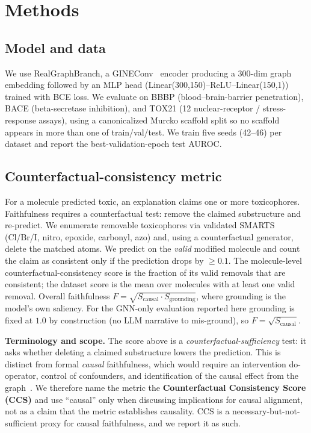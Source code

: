 \documentclass[journal]{IEEEtran}
\begin{document}
\section{Methods}
\subsection{Model and data}
We use RealGraphBranch, a GINEConv~\cite{xu2019powerful} encoder producing a
300-dim graph embedding followed by an MLP head
(Linear(300,150)--ReLU--Linear(150,1)) trained with BCE loss. We evaluate on BBBP
(blood--brain-barrier penetration), BACE (beta-secretase inhibition), and TOX21
(12 nuclear-receptor / stress-response assays), using a canonicalized Murcko
scaffold split so no scaffold appears in more than one of train/val/test. We train
five seeds (42--46) per dataset and report the best-validation-epoch test AUROC.

\subsection{Counterfactual-consistency metric}
\label{sec:metric}
For a molecule predicted toxic, an explanation claims one or more toxicophores.
Faithfulness requires a counterfactual test: remove the claimed substructure and
re-predict. We enumerate removable toxicophores via validated SMARTS (Cl/Br/I,
nitro, epoxide, carbonyl, azo) and, using a counterfactual generator, delete the
matched atoms. We predict on the \emph{valid} modified molecule and count the
claim as consistent only if the prediction drops by $\geq 0.1$. The molecule-level
counterfactual-consistency score is the fraction of its valid removals that are
consistent; the dataset score is the mean over molecules with at least one valid
removal. Overall faithfulness $F = \sqrt{S_{\text{causal}} \cdot S_{\text{grounding}}}$,
where grounding is the model's own saliency. For the GNN-only evaluation reported
here grounding is fixed at $1.0$ by construction (no LLM narrative to mis-ground),
so $F = \sqrt{S_{\text{causal}}}$.

\textbf{Terminology and scope.} The score above is a \emph{counterfactual-sufficiency}
test: it asks whether deleting a claimed substructure lowers the prediction. This
is distinct from formal \emph{causal} faithfulness, which would require an
intervention do-operator, control of confounders, and identification of the
causal effect from the graph~\cite{pearl2009causality}. We therefore name the
metric the \textbf{Counterfactual Consistency Score (CCS)} and use ``causal''
only when discussing implications for causal alignment, not as a claim that the
metric establishes causality. CCS is a necessary-but-not-sufficient proxy for
causal faithfulness, and we report it as such.
\end{document}
